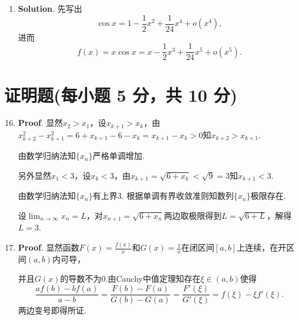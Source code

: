 \documentclass[../main.tex]{subfiles}
\begin{document}
\begin{enumerate}
          即半径以$\frac{1}{200\pi}\mathrm{cm}/\mathrm{min}$的速度减小.

    \item \textbf{Solution}. 先写出
          \[
              \cos x=1-\frac{1}{2}x^{2}+\frac{1}{24}x^{4}+o(x^{4}),
          \]
          进而
          \[
              f(x)=x\cos x=x-\frac{1}{2}x^{3}+\frac{1}{24}x^{5}+o(x^{5}).
          \]
\end{enumerate}

\section{证明题(每小题 5 分，共 10 分)}
\begin{enumerate}
    \setcounter{enumi}{15}
    \item \textbf{Proof}. 显然$x_{2}>x_{1}$，设$x_{k+1}>x_{k}$，由$x_{k+2}^{2}-x_{k+1}^{2}=6+x_{k+1}-
              6-x_{k}=x_{k+1}-x_{k}>0$知$x_{k+2}>x_{k+1}$.

          由数学归纳法知$\{x_{n}\}$严格单调增加.

          另外显然$x_{1}<3$，设$x_{k}<3$，由$x_{k+1}=\sqrt{6+x_{k}}<\sqrt{9}=3$知$x_{k+1}
              <3$.

          由数学归纳法知$\{x_{n}\}$有上界3. 根据单调有界收敛准则知数列$\{x_{n}\}$极限存在.

          设$\lim_{n\to\infty}x_{n}=L$，对$x_{n+1}=\sqrt{6+x_{n}}$两边取极限得到$L=\sqrt{6+L}$，解得$L
              =3$.

    \item \textbf{Proof}. 显然函数$F(x)=\frac{f(x)}{x}$和$G(x)=\frac{1}{x}$在闭区间$[
                  a,b]$上连续，在开区间$(a,b) $内可导，

          并且$G(x)$的导数不为0.由Cauchy中值定理知存在$\xi\in(a,b)$使得
          \[
              \frac{af(b)-bf(a)}{a-b}=\frac{F(b)-F(a)}{G(b)-G(a)}=\frac{F'(\xi)}{G'(\xi)}
              =f(\xi)-\xi f'(\xi).
          \]
          两边变号即得所证.
\end{enumerate}
\end{document}
